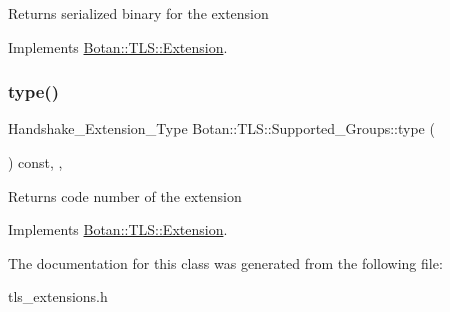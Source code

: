 \begin{DoxyReturn}{Returns}
serialized binary for the extension 
\end{DoxyReturn}


Implements \hyperlink{class_botan_1_1_t_l_s_1_1_extension_a56788726ad2526db54e5a26039cb69db}{Botan\+::\+T\+L\+S\+::\+Extension}.

\mbox{\label{class_botan_1_1_t_l_s_1_1_supported___groups_ab3126c91ffe1b598019892ed08117a67}} 
\subsubsection{\texorpdfstring{type()}{type()}}
{\footnotesize\ttfamily Handshake\+\_\+\+Extension\+\_\+\+Type Botan\+::\+T\+L\+S\+::\+Supported\+\_\+\+Groups\+::type (\begin{DoxyParamCaption}{ }\end{DoxyParamCaption}) const\hspace{0.3cm}{\ttfamily [inline]}, {\ttfamily [override]}, {\ttfamily [virtual]}}

\begin{DoxyReturn}{Returns}
code number of the extension 
\end{DoxyReturn}


Implements \hyperlink{class_botan_1_1_t_l_s_1_1_extension_ac8819b312ce604453225e7b4f7c373ec}{Botan\+::\+T\+L\+S\+::\+Extension}.



The documentation for this class was generated from the following file\+:\begin{DoxyCompactItemize}
\item 
tls\+\_\+extensions.\+h\end{DoxyCompactItemize}
